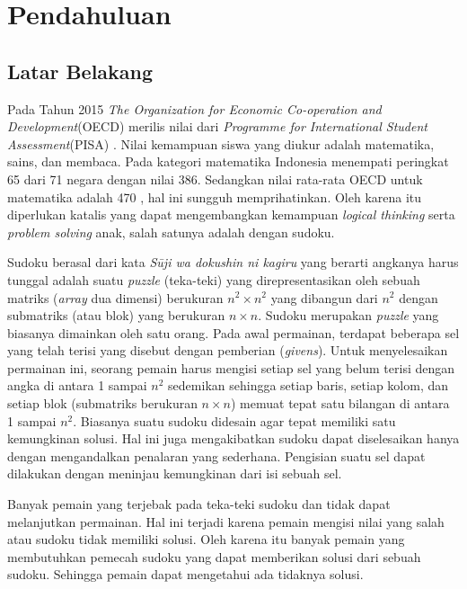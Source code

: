 \chapter{Pendahuluan}

\section{Latar Belakang}

Pada Tahun 2015 \textit{The Organization for Economic Co-operation and Development}(OECD) merilis nilai dari \textit{Programme for International Student Assessment}(PISA) \cite{Pisa1}. Nilai kemampuan siswa yang diukur adalah matematika, sains, dan membaca. Pada kategori matematika Indonesia menempati peringkat 65 dari 71 negara dengan nilai 386. Sedangkan nilai rata-rata OECD untuk matematika adalah 470 \cite{Pisa2}, hal ini sungguh memprihatinkan. Oleh karena itu diperlukan katalis yang dapat mengembangkan kemampuan \textit{logical thinking} serta \textit{problem solving} anak, salah satunya adalah dengan sudoku. 

Sudoku berasal dari kata \textit{Sūji wa dokushin ni kagiru} yang berarti angkanya harus tunggal \cite{SATPy3} adalah suatu \textit{puzzle} (teka-teki) yang direpresentasikan oleh sebuah matriks (\textit{array}
dua dimensi) berukuran ${n^2 \times n^2}$  yang dibangun dari ${n^2}$ dengan submatriks (atau blok)
yang berukuran ${n \times n}$. Sudoku merupakan \textit{puzzle}
yang biasanya dimainkan oleh satu orang.  Pada
awal permainan, terdapat beberapa sel yang telah terisi yang disebut dengan pemberian
(\textit{givens}). Untuk menyelesaikan permainan ini, seorang pemain harus mengisi setiap sel yang
belum terisi dengan angka di antara 1 sampai
$n^2$ sedemikan sehingga setiap baris, setiap kolom,
dan setiap blok (submatriks berukuran $n \times n$) memuat tepat satu bilangan di antara 1 sampai $n^2$. Biasanya suatu sudoku didesain agar tepat memiliki satu kemungkinan solusi. Hal
ini juga mengakibatkan sudoku dapat diselesaikan hanya dengan mengandalkan penalaran
yang sederhana. Pengisian suatu sel dapat dilakukan dengan meninjau kemungkinan dari
isi sebuah sel.

Banyak pemain yang terjebak pada teka-teki sudoku dan tidak dapat melanjutkan permainan. Hal ini terjadi karena pemain mengisi nilai yang salah atau sudoku tidak memiliki solusi. Oleh karena itu banyak pemain yang membutuhkan pemecah sudoku yang dapat memberikan solusi dari sebuah sudoku. Sehingga pemain dapat mengetahui ada tidaknya solusi.

